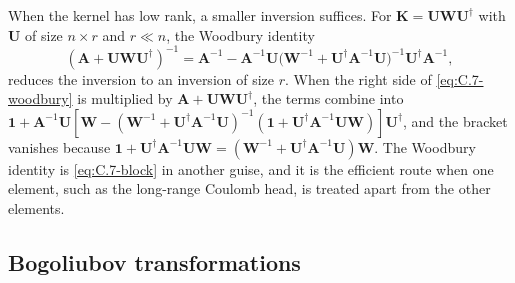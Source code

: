 When the kernel has low rank, a smaller inversion suffices. For $\mathbf{K} = \mathbf{U}\mathbf{W}\mathbf{U}^\dagger$ with $\mathbf{U}$ of size $n\times r$ and $r \ll n$, the Woodbury identity
\begin{equation}
  (\mathbf{A} + \mathbf{U}\mathbf{W}\mathbf{U}^\dagger)^{-1} = \mathbf{A}^{-1} - \mathbf{A}^{-1}\mathbf{U}\bigl(\mathbf{W}^{-1} + \mathbf{U}^\dagger\mathbf{A}^{-1}\mathbf{U}\bigr)^{-1}\mathbf{U}^\dagger\mathbf{A}^{-1} ,
  \label{eq:C.7-woodbury}
\end{equation}
reduces the inversion to an inversion of size $r$. When the right side of \cref{eq:C.7-woodbury} is multiplied by $\mathbf{A} + \mathbf{U}\mathbf{W}\mathbf{U}^\dagger$, the terms combine into $\mathbf{1} + \mathbf{A}^{-1}\mathbf{U}[\mathbf{W} - (\mathbf{W}^{-1} + \mathbf{U}^\dagger\mathbf{A}^{-1}\mathbf{U})^{-1}(\mathbf{1} + \mathbf{U}^\dagger\mathbf{A}^{-1}\mathbf{U}\mathbf{W})]\mathbf{U}^\dagger$, and the bracket vanishes because $\mathbf{1} + \mathbf{U}^\dagger\mathbf{A}^{-1}\mathbf{U}\mathbf{W} = (\mathbf{W}^{-1} + \mathbf{U}^\dagger\mathbf{A}^{-1}\mathbf{U})\mathbf{W}$. The Woodbury identity is \cref{eq:C.7-block} in another guise, and it is the efficient route when one element, such as the long-range Coulomb head, is treated apart from the other elements.

\subsection{Bogoliubov transformations}

